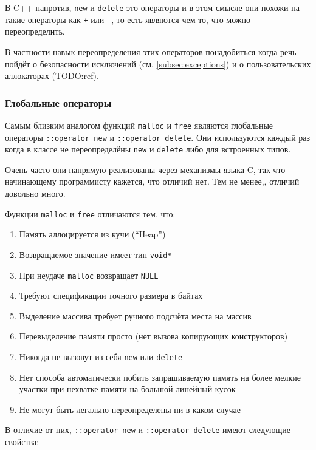 \documentclass[a4paper,12pt,oneside]{article}
\begin{document}
В C++ напротив, \lstinline!new! и \lstinline!delete! это операторы и в этом смысле они похожи на такие операторы как \lstinline!+! или \lstinline!-!, то есть являются чем-то, что можно переопределить.

В частности навык переопределения этих операторов понадобиться когда речь пойдёт о безопасности исключений (см. \ref{subsec:exceptions}) и о пользовательских аллокаторах (TODO:ref).

\subsubsection{Глобальные операторы}\label{subsub:globalnew}

Самым близким аналогом функций \lstinline!malloc! и \lstinline!free! являются глобальные операторы \lstinline!::operator new! и \lstinline!::operator delete!. Они используются каждый раз когда в классе не переопределёны \lstinline!new! и \lstinline!delete! либо для встроенных типов.

Очень часто они напрямую реализованы через механизмы языка C, так что начинающему программисту кажется, что отличий нет. Тем не менее,, отличий довольно много.

Функции \lstinline!malloc! и \lstinline!free! отличаются тем, что:

\begin{enumerate}
\item
Память аллоцируется из кучи (``Heap'')
\item
Возвращаемое значение имеет тип \lstinline!void*!
\item
При неудаче \lstinline!malloc! возвращает \lstinline!NULL!
\item
Требуют спецификации точного размера в байтах
\item
Выделение массива требует ручного подсчёта места на массив
\item
Перевыделение памяти просто (нет вызова копирующих конструкторов)
\item
Никогда не вызовут из себя \lstinline!new! или \lstinline!delete!
\item
Нет способа автоматически побить запрашиваемую память на более мелкие участки при нехватке памяти на большой линейный кусок
\item
Не могут быть легально переопределены ни в каком случае
\end{enumerate}

В отличие от них, \lstinline!::operator new! и \lstinline!::operator delete! имеют следующие свойства:
\end{document}
